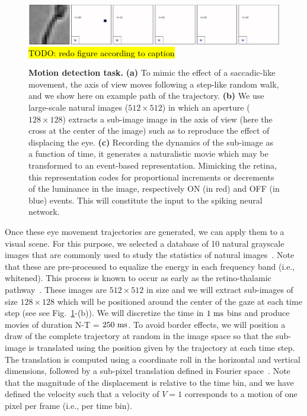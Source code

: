 \documentclass[default]{sn-jnl}%
\theoremstyle{thmstyleone}%
\theoremstyle{thmstyletwo}%
\theoremstyle{thmstylethree}%
\newcommand{\seeFig}[1]{see Fig.~\ref{fig:#1}}%
\newcommand{\note}[1]{{\sethlcolor{yellow}\hl{#1}}}
\begin{document}
\begin{figure}[h!]%
    \centering
    \includegraphics[width=0.95\linewidth]{figures/motion_task.pdf}
    \note{TODO: redo figure according to caption}
    \caption{
    {\bf Motion detection task.} {\bf (a)} To mimic the effect of a saccadic-like movement, the axis of view moves following a step-like random walk, and we show here on example path of the trajectory. {\bf (b)} We use large-scale natural images ($512\times512$) in which an aperture ($128\times128$) extracts a sub-image image in the axis of view (here the cross at the center of the image) such as to reproduce the effect of displacing the eye. {\bf (c)} Recording the dynamics of the sub-image as a function of time, it generates a naturalistic movie which may be transformed to an event-based representation. Mimicking the retina, this representation codes for proportional increments or decrements of the luminance in the image, respectively ON (in red) and OFF (in blue) events. This will constitute the input to the spiking neural network.}
    \label{fig:motion_task}
\end{figure}
Once these eye movement trajectories are generated, we can apply them to a visual scene. For this purpose, we selected a database of 10 natural grayscale images that are commonly used to study the statistics of natural images~\citep{olshausen_emergence_1996}. Note that these are pre-processed to equalize the energy in each frequency band (i.e., whitened). This process is known to occur as early as the retino-thalamic pathway~\citep{dan_efficient_1996}. These images are $512 \times 512$ in size and we will extract sub-images of size $128 \times 128$ which will be positioned around the center of the gaze at each time step (see \seeFig{motion_task}-(b)). We will discretize the time in $1~\si{\milli\second}$ bins and produce movies of duration N-T = $250~\si{\milli\second}$. To avoid border effects, we will position a draw of the complete trajectory at random in the image space so that the sub-image is translated using the position given by the trajectory at each time step. The translation is computed using a coordinate roll in the horizontal and vertical dimensions, followed by a sub-pixel translation defined in Fourier space~\citep{perrinet_sparse_2015}. Note that the magnitude of the displacement is relative to the time bin, and we have defined the velocity such that a velocity of $V=1$ corresponds to a motion of one pixel per frame (i.e., per time bin).
\end{document}
